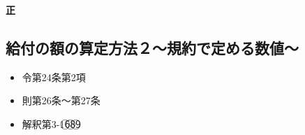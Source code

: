 \begin{answerbox}
  \textbf{正}
\end{answerbox}

\newpage

\subsection{給付の額の算定方法２〜規約で定める数値〜}

\begin{InyouJobunbox}
  \begin{itemize}
    \item 令第24条第2項
    \item 則第26条〜第27条
    \item 解釈第3-1\textcircled{6}\textcircled{8}\textcircled{9}
  \end{itemize}
\end{InyouJobunbox}

